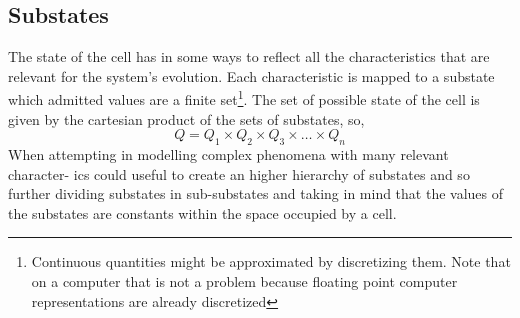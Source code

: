 \subsection{Substates}
The state of the cell has in some ways to reflect all the characteristics that
are relevant for the system's evolution. Each characteristic is mapped
to a substate which admitted values are a finite set\footnote{Continuous
quantities might be approximated by discretizing them. Note that on a computer
that is not a problem because floating point computer representations are
already discretized}.
The set of possible state of the cell is given by the cartesian product of  the
sets of substates, so, 
\[
Q = Q_1 \times Q_2 \times Q_3 \times \ldots \times Q_n
\]
When attempting in modelling complex phenomena with many relevant character-
ics could useful to create an higher hierarchy of substates and so further dividing
substates in sub-substates and taking in mind that the values of the substates are
constants within the space occupied by a cell.

